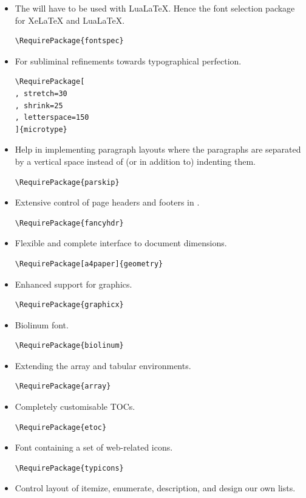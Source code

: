\documentclass{letgut}
\begin{document}
\begin{itemize}
\item The  will have to be used with LuaLaTeX. Hence the font selection
package for XeLaTeX and LuaLaTeX.
\begin{lstlisting}
\RequirePackage{fontspec}
\end{lstlisting}
\item For subliminal refinements towards typographical perfection.
\begin{lstlisting}
\RequirePackage[
, stretch=30
, shrink=25
, letterspace=150
]{microtype}
\end{lstlisting}
\item Help in implementing paragraph layouts where the paragraphs are separated by
a vertical space instead of (or in addition to) indenting them.
\begin{lstlisting}
\RequirePackage{parskip}
\end{lstlisting}
\item Extensive control of page headers and footers in \LaTeXe.
\begin{lstlisting}
\RequirePackage{fancyhdr}
\end{lstlisting}
\item Flexible and complete interface to document dimensions.
\begin{lstlisting}
\RequirePackage[a4paper]{geometry}
\end{lstlisting}
\item Enhanced support for graphics.
\begin{lstlisting}
\RequirePackage{graphicx}
\end{lstlisting}
\item Biolinum font.
\begin{lstlisting}
\RequirePackage{biolinum}
\end{lstlisting}
\item Extending the array and tabular environments.
\begin{lstlisting}
\RequirePackage{array}
\end{lstlisting}
\item Completely customisable TOCs.
\begin{lstlisting}
\RequirePackage{etoc}
\end{lstlisting}
\item Font containing a set of web-related icons.
\begin{lstlisting}
\RequirePackage{typicons}
\end{lstlisting}
\item Control layout of itemize, enumerate, description, and design our own lists.

\end{itemize}
\end{document}
